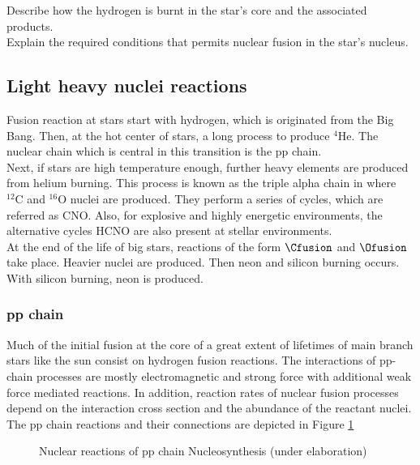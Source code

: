 \documentclass[openany]{book}
\begin{document}
Describe how the hydrogen is burnt in the star's core and the associated products.  \\


Explain the required conditions that permits nuclear fusion in the star's nucleus.

\subsection{Light heavy nuclei reactions} \label{sub:lightReactions}

Fusion reaction at stars start with hydrogen, which is originated from the Big Bang. Then, at the hot center of stars, a long process to produce $\mathrm{{}^{4}He}$. The nuclear chain which is central in this transition is the pp chain. \\

Next, if stars are high temperature enough, further heavy elements are produced from helium burning. This process is known as the triple alpha chain in where $\mathrm{{}^{12}C}$ and $\mathrm{{}^{16}O}$  nuclei are produced. They perform a series of cycles, which are referred as CNO. Also, for explosive and highly energetic environments, the alternative cycles HCNO are also present at stellar environments.  \\

At the end of the life of big stars, reactions of the form $\Cfusion$ and $\Ofusion$ take place. Heavier nuclei are produced. Then neon and silicon burning occurs. With silicon burning, neon is produced. 

\subsubsection{pp chain}

Much of the initial fusion at the core of a great extent of lifetimes of main branch stars like the sun consist on hydrogen fusion reactions. The interactions of pp-chain processes are mostly electromagnetic and strong force with additional weak force mediated reactions. In addition, reaction rates of nuclear fusion processes depend on the interaction cross section and the abundance of the reactant nuclei. \\

The pp chain reactions and their connections are depicted in Figure \ref{fig:nuclerReactionppChain}

\begin{figure}[H]
	
	\caption[Nuclear reactions of pp chain Nucleosynthesis]{Nuclear reactions of pp chain Nucleosynthesis (under elaboration)}
	\label{fig:nuclerReactionppChain}
\end{figure}
\end{document}

